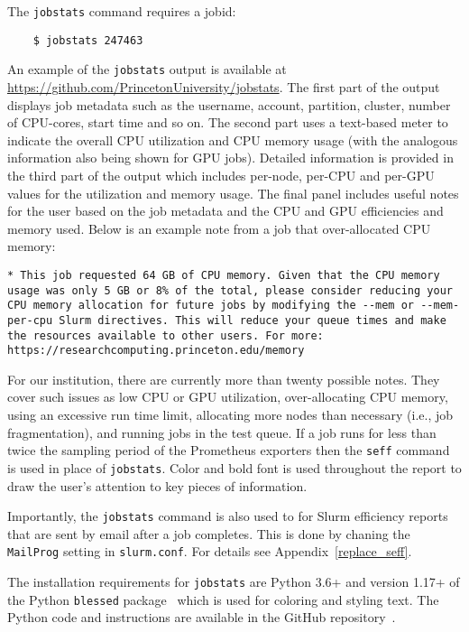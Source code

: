 The \texttt{jobstats} command requires a jobid:

\begin{verbatim}
    $ jobstats 247463
\end{verbatim}

\noindent
An example of the \texttt{jobstats} output is available at \url{https://github.com/PrincetonUniversity/jobstats}. The first part of the output displays job metadata such as the username, account, partition, cluster, number of CPU-cores, start time and so on. The second part uses a text-based meter to indicate the overall CPU utilization and CPU memory usage (with the analogous information also being shown for GPU jobs). Detailed information is provided in the third part of the output which includes per-node, per-CPU and per-GPU values for the utilization and memory usage. The final panel includes useful notes for the user based on the job metadata and the CPU and GPU efficiencies and memory used. Below is an example note from a job that over-allocated CPU memory:

\texttt{* This job requested 64 GB of CPU memory. Given that the CPU memory usage was only 5 GB or 8\% of the total, please consider reducing your CPU memory allocation for future jobs by modifying the -{}-mem or -{}-mem-per-cpu Slurm directives. This will reduce your queue times and make the resources available to other users. For more:
https://researchcomputing.princeton.edu/memory}

For our institution, there are currently more than twenty possible notes. They cover such issues as low CPU or GPU utilization, over-allocating CPU memory, using an excessive run time limit, allocating more nodes than necessary (i.e., job fragmentation), and running jobs in the test queue. If a job runs for less than twice the sampling period of the Prometheus exporters then the \texttt{seff} command is used in place of \texttt{jobstats}. Color and bold font is used throughout the report to draw the user's attention to key pieces of information.

Importantly, the \texttt{jobstats} command is also used to for Slurm efficiency reports that are sent by email after a job completes. This is done by chaning the \texttt{MailProg} setting in \texttt{slurm.conf}. For details see Appendix~\ref{replace_seff}.

The installation requirements for \texttt{jobstats} are Python 3.6+ and version 1.17+ of the Python \texttt{blessed} package~\cite{rose} which is used for coloring and styling text. The Python code and instructions are available in the GitHub repository~\cite{jobstats_repo}.


